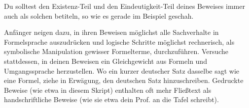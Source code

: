 \begin{bem}
    Du solltest den Existenz-Teil und den Eindeutigkeit-Teil deines Beweises immer auch als solchen betiteln, so wie es gerade im Beispiel geschah.
\end{bem}


\begin{bem}
    Anfänger neigen dazu, in ihren Beweisen möglichst alle Sachverhalte in Formelsprache auszudrücken und logische Schritte möglichst rechnerisch, als symbolische Manipulation gewisser Formelterme, durchzuführen. Versuche stattdessen, in deinen Beweisen ein Gleichgewicht aus Formeln und Umgangssprache herzustellen. Wo ein kurzer deutscher Satz dasselbe sagt wie eine Formel, ziehe in Erwägung, den deutschen Satz hinzuschreiben. Gedruckte Beweise (wie etwa in diesem Skript) enthalten oft mehr Fließtext als handschriftliche Beweise (wie sie etwa dein Prof. an die Tafel schreibt).
\end{bem}





